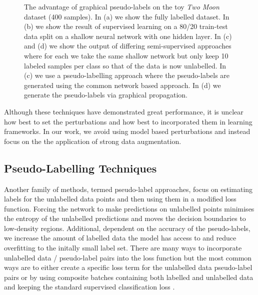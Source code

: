 \documentclass[journal]{IEEEtran}
\newcommand{\Angie}[1]{{\color{blue} #1}}
\begin{document}
\begin{figure}[t]
  \centering
  \hfill
  \caption{The advantage of graphical pseudo-labels on the toy \textit{Two Moon} dataset (400 samples). In (a) we show the fully labelled dataset. In (b) we show the result of supervised learning on a 80/20 train-test data split on a shallow neural network with one hidden layer. In (c) and (d) we show the output of differing semi-supervised approaches where for each we take the same shallow network but only keep 10 labeled samples per class so that  of the data is now unlabelled. In (c) we use a pseudo-labelling approach where the pseudo-labels are generated using the common network based approach. In (d) we generate the pseudo-labels via graphical propagation. }
\label{fig:comparedmoons}
\end{figure}

Although these techniques have demonstrated great performance, it is unclear how best to set the perturbations  and how best to incorporated them in learning frameworks. In our work, we avoid using model based perturbations and instead focus on the the application of strong data augmentation.

\smallskip
\subsection{Pseudo-Labelling Techniques} 
Another family of methods, termed pseudo-label approaches, focus on estimating labels for the unlabelled data points and then using them in a modified loss function. Forcing the network to make predictions on unlabelled points minimises the entropy of the unlabelled predictions \cite{SSTheory} and moves the decision boundaries to low-density regions. Additional, dependent on the accuracy of the pseudo-labels, we increase the amount of labelled data the model has access to and reduce overfitting to the initally small label set.   There are many ways to incorporate unlabelled data / pseudo-label pairs into the loss function but the most common ways are to either create a specific loss term for the unlabelled data pseudo-label pairs \Angie{\cite{sohn2020fixmatch,simplepseudo,xie2021muscle,assran2021semi}} or by using composite batches containing both labelled and unlabelled data and keeping the standard supervised classification loss \cite{iscen2019label,arazo2019pseudo}.
\end{document}
